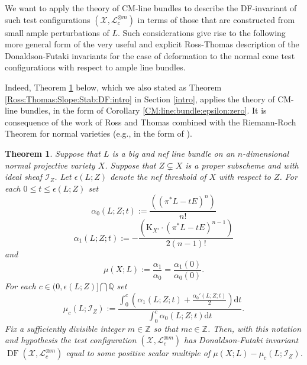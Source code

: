 \documentclass[12pt]{amsart}
\renewcommand{\leq}{\leqslant}
\newcommand{\K}{\mathrm{K}}
\newcommand{\Ish}{\mathcal{I}}
\newcommand{\QQ}{\mathbb{Q}} %
\newcommand{\ZZ}{\mathbb{Z}} %
\newtheorem{theorem}{Theorem}[section]
\theoremstyle{definition}
\numberwithin{equation}{section}
\begin{document}
We want to apply the theory of CM-line bundles to describe the DF-invariant of such test configurations $(\mathcal{X}, \mathcal{L}^{\otimes m}_c)$ in terms of those that are constructed from small ample perturbations of $L$.  Such considerations give rise to the following more general form of the very useful and explicit Ross-Thomas description of the Donaldson-Futaki invariants for the case of deformation to the normal cone test configurations with respect to ample line bundles.  

Indeed, Theorem \ref{Ross:Thomas:Slope:Stab:DF} below, which we also stated as Theorem \ref{Ross:Thomas:Slope:Stab:DF:intro} in Section \ref{intro}, applies the theory of CM-line bundles, in the form of Corollary \ref{CM:line:bundle:epsilon:zero}.  It is consequence of the work of Ross and Thomas \cite[Section 4]{Ross:Thomas:2007} combined with the Riemann-Roch Theorem for normal varieties (e.g., in the form of \cite[Theorem A.1]{Boucksom-Hisamoto-Jonsson:2016}).  

\begin{theorem}\label{Ross:Thomas:Slope:Stab:DF}
Suppose that $L$ is a big and nef line bundle on an $n$-dimensional normal projective variety $X$.  Suppose that $Z \subsetneq X$ is a proper subscheme and with ideal sheaf $\Ish_Z$.  Let $\epsilon(L;Z)$ denote the nef threshold of $X$ with respect to $Z$.  For each $0 \leq t \leq \epsilon(L;Z)$ set
\begin{equation}\label{alpha0}
\alpha_0(L;Z; t) := \frac{((\pi^*L - t E)^n )}{n!}
\end{equation}
\begin{equation}\label{alpha1}
\alpha_1(L;Z; t) := - \frac{(\K_{X'} \cdot(\pi^*L - t E)^{n-1})}{2(n-1)!}
\end{equation}
and
\begin{equation}\label{slope}
\mu(X;L) := \frac{\alpha_1}{\alpha_0} = \frac{\alpha_1(0)}{\alpha_0(0)} \text{.}
\end{equation}
For each 
$c \in (0, \epsilon(L;Z)] \bigcap \QQ$
set
$$
\mu_c(L;\Ish_Z) := \frac{ \int_0^c \left( \alpha_1(L;Z;t) + \frac{\alpha_0'(L;Z;t)}{2} \right) \mathrm{d}t }{ \int_0^c \alpha_0(L;Z;t) \mathrm{d}t } \text{.}
$$
Fix a sufficiently divisible integer $m \in \ZZ$ so that $mc \in \ZZ$.  Then, with this notation and hypothesis the test configuration $(\mathcal{X}, \mathcal{L}_c^{\otimes m})$ has Donaldson-Futaki invariant $\operatorname{DF}(\mathcal{X},\mathcal{L}_c^{\otimes m})$ equal to some positive scalar multiple of $\mu(X;L) - \mu_c(L;\Ish_Z)$.
\end{theorem}
\end{document}
